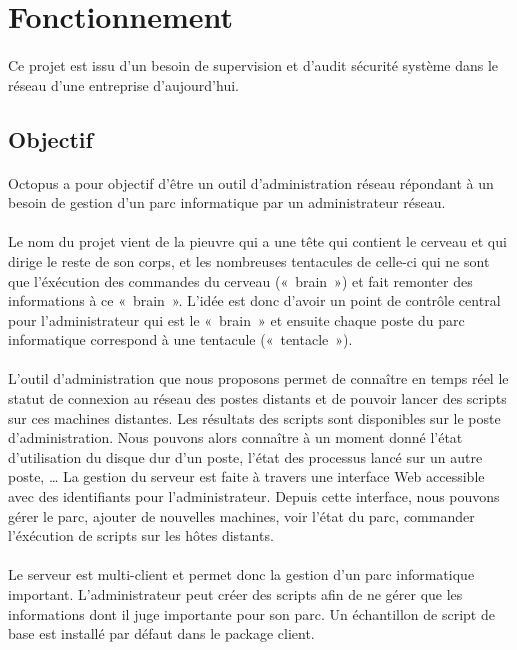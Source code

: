 \section{Fonctionnement}
\paragraph{}
Ce projet est issu d'un besoin de supervision et d'audit sécurité système dans le réseau d'une entreprise d'aujourd'hui.
\subsection{Objectif}
\paragraph{}
Octopus a pour objectif d'être un outil d'administration réseau répondant à un besoin de gestion d'un parc informatique par un administrateur réseau. 
\paragraph{}
Le nom du projet vient de la pieuvre qui a une tête qui contient le cerveau et qui dirige le reste de son corps, et les nombreuses tentacules de celle-ci qui ne sont que l'éxécution des commandes du cerveau (« brain ») et fait remonter des informations à ce « brain ». 
L'idée est donc d'avoir un point de contrôle central pour l'administrateur qui est le « brain » et ensuite chaque poste du parc informatique correspond à une tentacule (« tentacle »). 
\paragraph{}
L'outil d'administration que nous proposons permet de connaître en temps réel le statut de connexion au réseau des postes distants et de pouvoir lancer des scripts sur ces machines distantes. Les résultats des scripts sont disponibles sur le poste d'administration. Nous pouvons alors connaître à un moment donné l'état d'utilisation du disque dur d'un poste, l'état des processus lancé sur un autre poste, … La gestion du serveur est faite à travers une interface Web accessible avec des identifiants pour l'administrateur. Depuis cette interface, nous pouvons gérer le parc, ajouter de nouvelles machines, voir l'état du parc, commander l'éxécution de scripts sur les hôtes distants.
\paragraph{}
Le serveur est multi-client et permet donc la gestion d'un parc informatique important. L'administrateur peut créer des scripts afin de ne gérer que les informations dont il juge importante pour son parc. Un échantillon de script de base est installé par défaut dans le package client.


